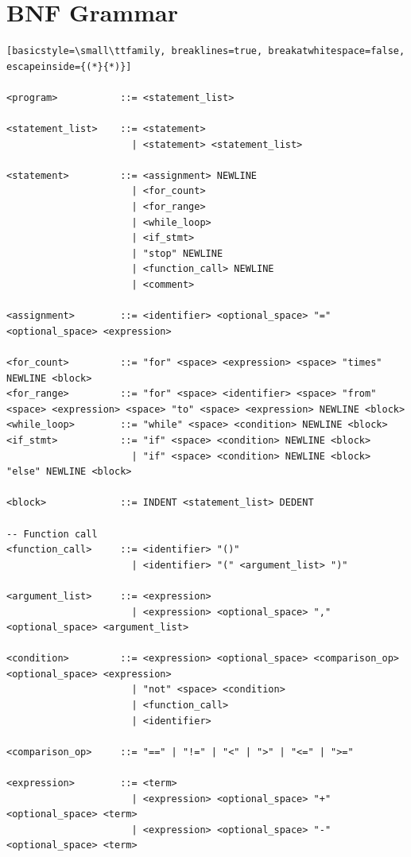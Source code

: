 \chapter{BNF Grammar}
\label{appendix:grammar}

\begin{lstlisting}[basicstyle=\small\ttfamily, breaklines=true, breakatwhitespace=false, escapeinside={(*}{*)}]
    
<program>           ::= <statement_list>

<statement_list>    ::= <statement>
                      | <statement> <statement_list>

<statement>         ::= <assignment> NEWLINE
                      | <for_count>
                      | <for_range>
                      | <while_loop>
                      | <if_stmt>
                      | "stop" NEWLINE
                      | <function_call> NEWLINE
                      | <comment>

<assignment>        ::= <identifier> <optional_space> "=" <optional_space> <expression>

<for_count>         ::= "for" <space> <expression> <space> "times" NEWLINE <block>
<for_range>         ::= "for" <space> <identifier> <space> "from" <space> <expression> <space> "to" <space> <expression> NEWLINE <block>
<while_loop>        ::= "while" <space> <condition> NEWLINE <block>
<if_stmt>           ::= "if" <space> <condition> NEWLINE <block>
                      | "if" <space> <condition> NEWLINE <block> "else" NEWLINE <block>

<block>             ::= INDENT <statement_list> DEDENT

-- Function call
<function_call>     ::= <identifier> "()"
                      | <identifier> "(" <argument_list> ")"

<argument_list>     ::= <expression>
                      | <expression> <optional_space> "," <optional_space> <argument_list>

<condition>         ::= <expression> <optional_space> <comparison_op> <optional_space> <expression>
                      | "not" <space> <condition>
                      | <function_call>
                      | <identifier>

<comparison_op>     ::= "==" | "!=" | "<" | ">" | "<=" | ">="

<expression>        ::= <term>
                      | <expression> <optional_space> "+" <optional_space> <term>
                      | <expression> <optional_space> "-" <optional_space> <term>


\end{lstlisting}

